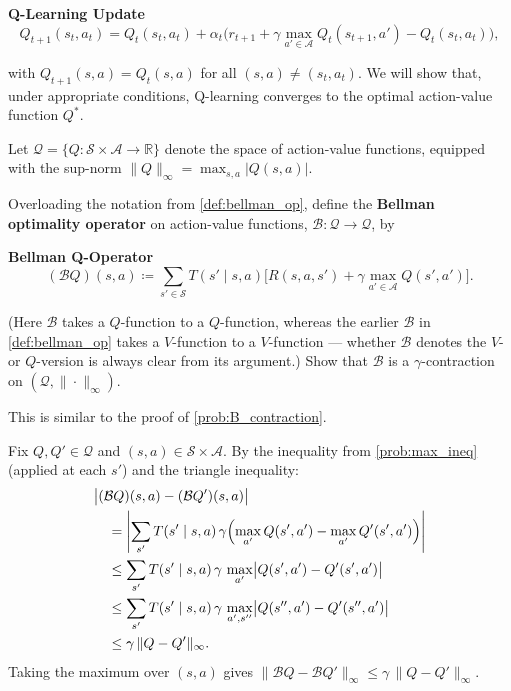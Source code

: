 \documentclass[11pt]{article}
\newcommand{\cS}{\mathcal{S}}
\newcommand{\cA}{\mathcal{A}}
\begin{document}
\begin{callout}[note]
\textbf{Q-Learning Update}
$$
Q_{t+1}(s_t, a_t) = Q_t(s_t, a_t) + \alpha_t\bigl(r_{t+1} + \gamma \max_{a' \in \cA} Q_t(s_{t+1}, a') - Q_t(s_t, a_t)\bigr),
$$
\end{callout}
with $Q_{t+1}(s,a) = Q_t(s,a)$ for all $(s,a) \neq (s_t, a_t)$.
We will show that, under appropriate conditions, Q-learning converges to the optimal action-value function $Q^*$.

Let $\mathcal{Q} = \{Q : \cS \times \cA \to \mathbb{R}\}$ denote the space of action-value functions, equipped with the sup-norm $\|Q\|_\infty = \max_{s,a} |Q(s,a)|$.

\begin{exercise}
\label{prob:BQ_contraction} Overloading the notation from \cref{def:bellman_op}, define the \textbf{Bellman optimality operator} on action-value functions, $\mathcal{B} : \mathcal{Q} \to \mathcal{Q}$, by
\begin{callout}[note]
\textbf{Bellman Q-Operator}
$$
(\mathcal{B}Q)(s,a) \coloneqq \sum_{s' \in \cS} T(s' \mid s, a)\bigl[R(s,a,s') + \gamma \max_{a' \in \cA} Q(s', a')\bigr].
$$
\end{callout}
(Here $\mathcal{B}$ takes a $Q$-function to a $Q$-function, whereas the earlier $\mathcal{B}$ in \cref{def:bellman_op} takes a $V$-function to a $V$-function --- whether $\mathcal{B}$ denotes the $V$- or $Q$-version is always clear from its argument.) Show that $\mathcal{B}$ is a $\gamma$-contraction on $(\mathcal{Q}, \|\cdot\|_\infty)$.

\begin{hint}
This is similar to the proof of \cref{prob:B_contraction}.
\end{hint}
\end{exercise}

\begin{solution}
Fix $Q, Q' \in \mathcal{Q}$ and $(s,a) \in \cS \times \cA$. By the inequality from \cref{prob:max_ineq} (applied at each $s'$) and the triangle inequality:
\begin{align*}
&\bigl|(\mathcal{B}Q)(s,a) - (\mathcal{B}Q')(s,a)\bigr| \\
&\quad= \left|\sum_{s'} T(s' \mid s,a)\,\gamma\Bigl(\max_{a'} Q(s',a') - \max_{a'} Q'(s',a')\Bigr)\right| \\
&\quad\le \sum_{s'} T(s' \mid s,a)\,\gamma\,\max_{a'}\bigl|Q(s',a') - Q'(s',a')\bigr| \\
&\quad\le \sum_{s'} T(s' \mid s,a)\,\gamma\,\max_{a', s''}\bigl|Q(s'',a') - Q'(s'',a')\bigr| \\
&\quad\le \gamma\,\|Q - Q'\|_\infty.
\end{align*}
Taking the maximum over $(s,a)$ gives $\|\mathcal{B}Q - \mathcal{B}Q'\|_\infty \le \gamma\,\|Q - Q'\|_\infty$.
\end{solution}
\end{document}
